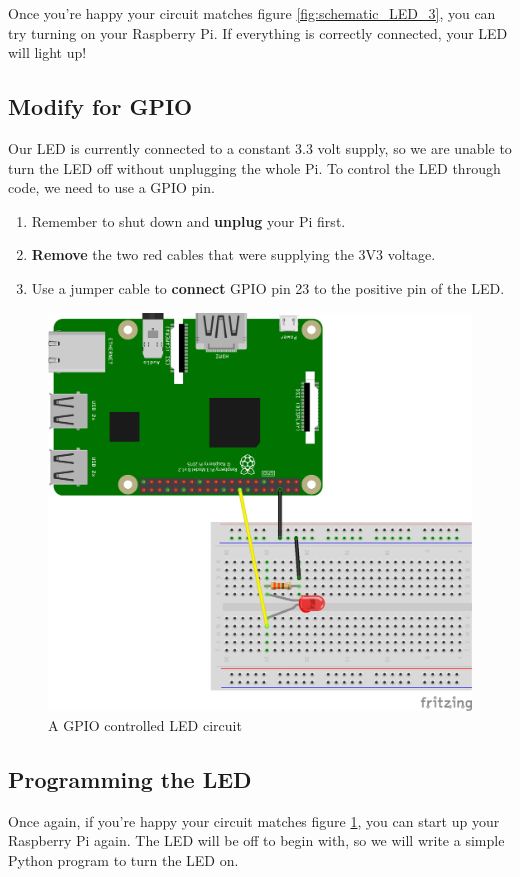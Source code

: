 		Once you're happy your circuit matches figure \ref{fig:schematic_LED_3}, you can try turning on your Raspberry Pi. If everything is correctly connected, your LED will light up!
		
	\subsection{Modify for GPIO}
	
			Our LED is currently connected to a constant 3.3 volt supply, so we are unable to turn the LED off without unplugging the whole Pi. To control the LED through code, we need to use a GPIO pin.
	
			\begin{enumerate}[nosep]
				\item Remember to shut down and \textbf{unplug} your Pi first.
				\item \textbf{Remove} the two red cables that were supplying the 3V3 voltage.
				\item Use a jumper cable to \textbf{connect} GPIO pin 23 to the positive pin of the LED.
			\end{enumerate}	
		
			\begin{figure}[h]
				\centering
				\includegraphics[width=0.6\linewidth]{sections/1_LED/schematic_LED_4}
				\caption{A GPIO controlled LED circuit}
				\label{fig:schematic_LED_4}
			\end{figure}
		
	\subsection{Programming the LED}
		
			Once again, if you're happy your circuit matches figure \ref{fig:schematic_LED_4}, you can start up your Raspberry Pi again.
			The LED will be off to begin with, so we will write a simple Python program to turn the LED on.
			
